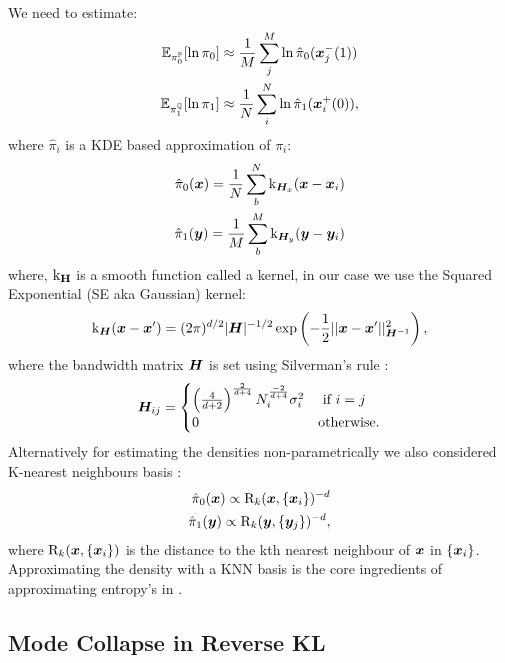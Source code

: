 \documentclass[a4paper,12pt,twoside,openright]{report}
\theoremstyle{definition}
\begin{document}
We need to estimate:
\begin{align*}
\mathbb{E}_{\pi_0^{\mathbb{P}}}[\ln\pi_{0}] &\approx \frac{1}{M}\sum_{j}^{M} \ln \hat{\pi}_0({\bm{x}}_j^{-}(1)) \\
\mathbb{E}_{\pi_1^{\mathbb{Q}}}[\ln\pi_{1}] &\approx \frac{1}{N}\sum_{i}^{N} \ln \hat{\pi}_1({\bm{x}}_i^{+}(0)),
\end{align*}
where $\hat{\pi}_i$ is a KDE based approximation of $\pi_i$:
\begin{align*}
\hat{\pi}_0({\bm{x}}) = \frac{1}{N} \sum_b^{N} {\text{k}}_{{\bm{H}}_x}({\bm{x}} - {\bm{x}}_i) \\
\hat{\pi}_1({\bm{y}}) = \frac{1}{M} \sum_b^{M} {\text{k}}_{{\bm{H}}_y}({\bm{y}} - {\bm{y}}_i)
\end{align*}
where, ${\text{k}}_{\textbf{H}}$ is a smooth function called a kernel, in our case we use the Squared Exponential (SE aka Gaussian) kernel:
\begin{align*}
{\text{k}}_{{\bm{H}}}({\bm{x}}-{\bm{x}}') = (2\pi)^{d/2}|{\bm{H}}|^{-1/2}\exp\left(-\frac{1}{2}||{\bm{x}}-{\bm{x}}'||^{2}_{{\bm{H}}^{-1}}\right),
\end{align*}
where the bandwidth matrix ${\bm{H}}$ is set using Silverman's rule :
\begin{align}
{\bm{H}}_{ij} = \begin{cases}
\left(\frac{4}{d+2}\right)^{\frac{2}{d+4}} N_i^{\frac{-2}{d+4}} \sigma_{i}^2  &\text{  if  } i=j \\
0  &\text{otherwise}.
\end{cases}
\end{align}
Alternatively for estimating the densities non-parametrically we also considered K-nearest neighbours basis \citep{veksler2013nonparametric}:
\begin{align*}
\hat{\pi}_0({\bm{x}}) \propto  \text{R}_k({\bm{x}}, \{{\bm{x}}_i\})^{-d}\\
\hat{\pi}_1({\bm{y}}) \propto \text{R}_k({\bm{y}}, \{{\bm{y}}_j\})^{-d},
\end{align*}
where $\text{R}_k({\bm{x}}, \{{\bm{x}}_i\})$ is the distance to the kth nearest neighbour of ${\bm{x}}$ in $\{{\bm{x}}_i\}$.  Approximating the density with a KNN basis is the core ingredients of approximating entropy's in \cite{singh2016analysis}.

\subsection{Mode Collapse in Reverse KL}
\end{document}
